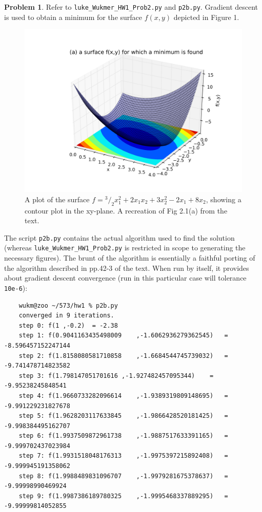 \documentclass[10pt]{article}
\theoremstyle{plain}
\theoremstyle{definition}
\newtheorem{prob}{Problem}
\numberwithin{equation}{section}
\newcommand*\rfrac[2]{{}^{#1}\!/_{#2}}
\begin{document}
\begin{prob}
    Refer to \texttt{luke\_Wukmer\_HW1\_Prob2.py} and \texttt{p2b.py}.
    Gradient descent is used to obtain a minimum for the surface
    $f(x,y)$ depicted in Figure 1.
    \begin{figure}[h]
        \centering
        \includegraphics[width=\textwidth]{fig1}
        \caption{A plot of the surface
            $f = \rfrac{3}{2}x_1^2 + 2x_1 x_2 + 3x_2^2 - 2x_1 + 8x_2$,
          showing a contour plot in the xy-plane.
          A recreation of Fig 2.1(a) from the text.} 
    \end{figure}

    The script \texttt{p2b.py} contains the actual algorithm used to find the
    solution (whereas \texttt{luke\_Wukmer\_HW1\_Prob2.py} is restricted in
    scope to generating the necessary figures). The brunt of the algorithm is
    essentially a faithful porting of the algorithm described in pp.42-3 of the
    text. When run by itself, it provides about gradient descent convergence
    (run in this particular case will tolerance \texttt{10e-6}):
    
    \begin{small}
    \begin{verbatim}
    wukm@zoo ~/573/hw1 % p2b.py
    converged in 9 iterations.
    step 0: f(1	,-0.2)	= -2.38
    step 1: f(0.9041163435498009	,-1.6062936279362545)	= -8.596457152247144
    step 2: f(1.8158080581710858	,-1.6684544745739032)	= -9.741478714823582
    step 3: f(1.798147051701616	,-1.927482457095344)	= -9.95238245848541
    step 4: f(1.9660733282096614	,-1.9389319809148695)	= -9.991229231827678
    step 5: f(1.9628203117633845	,-1.9866428520181425)	= -9.998384495162707
    step 6: f(1.9937509872961738	,-1.9887517633391165)	= -9.999702437023984
    step 7: f(1.9931518048176313	,-1.9975397215892408)	= -9.999945191358062
    step 8: f(1.9988489831096707	,-1.9979281675378637)	= -9.99998990469924
    step 9: f(1.9987386189780325	,-1.9995468337889295)	= -9.99999814052855
    \end{verbatim} 
    \end{small}
    

\end{prob}
\end{document}
